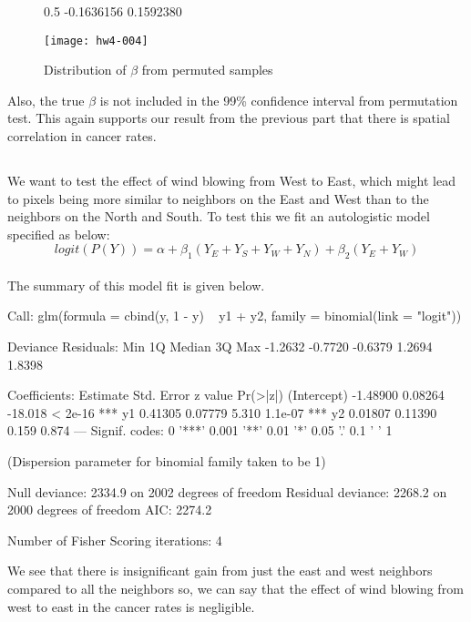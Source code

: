\documentclass{article}
\begin{document}
\begin{figure}[]
\centering
\begin{Schunk}
\begin{Soutput}
      0.5%      99.5% 
-0.1636156  0.1592380 
\end{Soutput}
\end{Schunk}
\texttt{[image: hw4-004]}
\caption{Distribution of $\beta$ from permuted samples}
\label{fig2}
\end{figure}
Also, the true $\beta$ is not included in the 99\% confidence interval from permutation test. This again supports our result from the previous part that there is spatial correlation in cancer rates.\\


\subsection{}
We want to test the effect of wind blowing from West to East, which might lead to pixels being more similar to neighbors on the East and West than to the neighbors on the North and South. To test this we fit an autologistic model specified as below:\\
$$logit(P(Y))=\alpha +\beta_1(Y_E+Y_S+Y_W+Y_N)+\beta_2(Y_E+Y_W)$$\\
The summary of this model fit is given below.\\
\begin{Schunk}
\begin{Soutput}
Call:
glm(formula = cbind(y, 1 - y) ~ y1 + y2, family = binomial(link = "logit"))

Deviance Residuals: 
    Min       1Q   Median       3Q      Max  
-1.2632  -0.7720  -0.6379   1.2694   1.8398  

Coefficients:
            Estimate Std. Error z value Pr(>|z|)    
(Intercept) -1.48900    0.08264 -18.018  < 2e-16 ***
y1           0.41305    0.07779   5.310  1.1e-07 ***
y2           0.01807    0.11390   0.159    0.874    
---
Signif. codes:  0 '***' 0.001 '**' 0.01 '*' 0.05 '.' 0.1 ' ' 1

(Dispersion parameter for binomial family taken to be 1)

    Null deviance: 2334.9  on 2002  degrees of freedom
Residual deviance: 2268.2  on 2000  degrees of freedom
AIC: 2274.2

Number of Fisher Scoring iterations: 4
\end{Soutput}
\end{Schunk}
We see that there is insignificant gain from just the east and west neighbors compared to all the neighbors so, we can say that the effect of wind blowing from west to east in the cancer rates is negligible.\\
\end{document}
